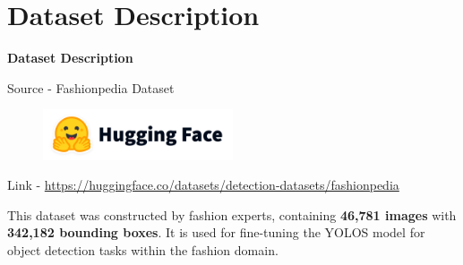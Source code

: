 \section{Dataset Description}
\begin{frame}{}
  \Huge
  \centering
  \textbf{Dataset Description}
  \normalsize
\end{frame}

\begin{frame}{Source - Fashionpedia Dataset}

  \begin{figure}[H]
    \centering
    \includegraphics[width=0.5\textwidth]{images/hugging-face.png}
  \end{figure}
  Link - \footnotesize \href{https://huggingface.co/datasets/detection-datasets/fashionpedia}{https://huggingface.co/datasets/detection-datasets/fashionpedia}\\
  \normalsize

  This dataset was constructed by fashion experts, containing \textbf{46,781 images} with \textbf{342,182 bounding boxes}. It is used for fine-tuning the YOLOS model for object detection tasks within the fashion domain.

\end{frame}

